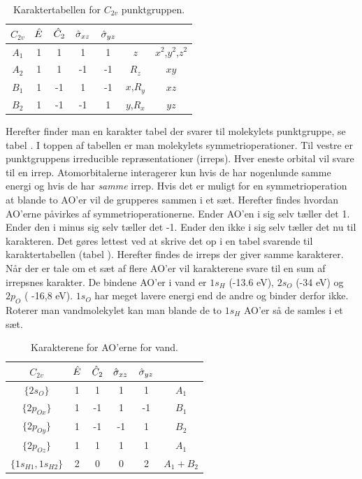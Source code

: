 \documentclass[../../Atom-ogMolekylefysik.tex]{subfiles}
\begin{document}
\begin{table}[h]
    \centering
    \begin{tabular}{c|c c c c c c}
$C_{2v}$ & $\hat E$ & $\hat C_2$ & $\hat \sigma_{xz}$ & $\hat \sigma_{yz}$\\\hline
$A_1$ & 1&1&1&1 & $z$ & $x^2$,$y^2$,$z^2$\\
$A_2$ & 1&1&-1&-1&$R_z$& $xy$\\
$B_1$ & 1 & -1&1&-1&$x$,$R_y$&$xz$\\
$B_2$ & 1&-1&-1&1&$y$,$R_x$ & $yz$
    \end{tabular}
    \caption{Karaktertabellen for $C_{2v}$ punktgruppen.}
    \label{tab:amo:C2v}
\end{table}
Herefter finder man en karakter tabel der svarer til molekylets punktgruppe, se tabel . 
I toppen af tabellen er man molekylets symmetrioperationer. Til vestre er punktgruppens irreducible repræsentationer (irreps). Hver eneste orbital vil svare til en irrep. Atomorbitalerne interagerer kun hvis de har nogenlunde samme energi og hvis de har {\em samme} irrep. Hvis det er muligt for en symmetrioperation at blande to AO'er vil de grupperes sammen i et sæt. Herefter findes hvordan AO'erne påvirkes af symmetrioperationerne. Ender AO'en i sig selv tæller det 1. Ender den i minus sig selv tæller det -1. Ender den ikke i sig selv tæller det nu til karakteren. Det gøres lettest ved at skrive det op i en tabel svarende til karaktertabellen (tabel ). Herefter findes de irreps der giver samme karakterer. Når der er tale om et sæt af flere AO'er vil karakterene svare til en sum af irrepsnes karakter. De bindene AO'er i vand er $1s_H$ (-13.6 eV), $2s_O$ (-34 eV) og $2p_O$ ( -16,8 eV). $1s_O$ har meget lavere energi end de andre og binder derfor ikke.
Roterer man vandmolekylet kan man blande de to $1s_H$ AO'er så de samles i et sæt.
\begin{table}[h]
    \centering
    \begin{tabular}{c|c c c c c}
$C_{2v}$ & $\hat E$ & $\hat C_2$ & $\hat \sigma_{xz}$ & $\hat \sigma_{yz}$\\\hline
$\{2s_O\}$ & 1 & 1 & 1 & 1 & $A_1$\\
$\{2p_{Ox}\}$ & 1 & -1 & 1 & -1 & $B_1$\\
$\{2p_{Oy}\}$ & 1 & -1 & -1 & 1 & $B_2$\\
$\{2p_{Oz}\}$ & 1 & 1 & 1 & 1 & $A_1$\\
$\{1s_{H1},1s_{H2}\}$ & 2 & 0 & 0 & 2 & $A_1+B_2$
    \end{tabular}
    \caption{Karakterene for AO'erne for vand.}
    \label{tab:amo:MOvand}
\end{table}
\end{document}

